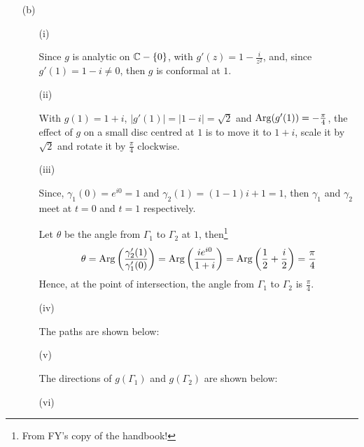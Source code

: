 \begin{itemize}
\begin{itemize}
\end{itemize}

\item[(b)]

\begin{itemize}
\item[(i)]

Since $g$ is analytic on $\mathbb{C}-\{0\}$, with $g'(z) = 1-\frac{i}{z^2}$,
and, since $g'(1)=1-i\ne0$, then $g$ is conformal at $1$.

\item[(ii)]

With $g(1)=1+i$, $|g'(1)|=|1-i|=\sqrt{2}$ and
${\rm Arg}(g'(1))=-\frac{\pi}{4}$,
the effect of $g$ on a small disc centred at $1$ is to move it to $1+i$,
scale it by $\sqrt{2}$ and rotate it by $\frac{\pi}{4}$ clockwise.

\item[(iii)]

Since, $\gamma_1(0) = e^{i0} = 1$ and $\gamma_2(1) = (1-1)i+1 = 1$,
then $\gamma_1$ and $\gamma_2$ meet at $t=0$ and $t=1$ respectively.

Let $\theta$ be the angle from $\Gamma_1$ to $\Gamma_2$ at $1$,
then\footnote{From FY's copy of the handbook!}
\[
\theta	= {\rm Arg} \left( \frac{ \gamma_2'(1) }{ \gamma_1'(0) } \right)
	= {\rm Arg} \left( \frac{ ie^{i0} }{ 1+i } \right)
	= {\rm Arg} \left( \frac{1}{2} + \frac{i}{2} \right)
	= \frac{\pi}{4}
\]
Hence, at the point of intersection, the angle from $\Gamma_1$ to
$\Gamma_2$ is $\frac{\pi}{4}$.

\item[(iv)]

The paths are shown below:



\item[(v)]

The directions of $g(\Gamma_1)$ and $g(\Gamma_2)$ are shown below:



\item[(vi)]
\todo
\end{itemize}

\end{itemize}

